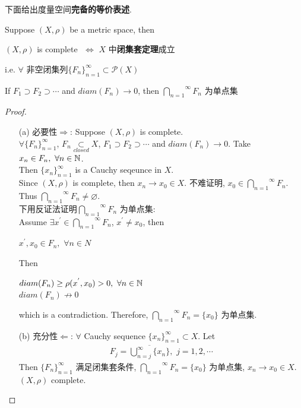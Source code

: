 	下面给出度量空间\textbf{完备的等价表述}.
	\begin{proposition}\label{prop 1.2.1}
		Suppose $(X , \rho)$ be a metric space, then
		\begin{center}
			$(X , \rho)$ is complete $\,\, \Leftrightarrow \,\, X$ 中\textbf{闭集套定理}成立
		\end{center}
		i.e. $\forall$ 非空闭集列$\{ F_n \}_{n = 1}^{\infty} \subset \mathcal{P}(X)$ 
		\begin{center}
			If $F_1 \supset F_2 \supset \cdots$ and $diam(F_n) \to 0$, then $\overset{\infty}{\underset{n = 1}{\bigcap}}{F_n}$ 为单点集
		\end{center}
		
		\vspace{6em}
		
		\begin{proof}
			\begin{enumerate}
				\item[(a)] 必要性$\Rightarrow$: Suppose $(X , \rho)$ is complete. \\
				$\forall \{ F_n \}_{n = 1}^{\infty}$, $F_n \underset{closed}{\subset} X$, $F_1 \supset F_2 \supset \cdots$ and $diam(F_n) \to 0$. Take $x_n \in F_n, \,\, \forall n \in \mathbb{N}$. \\
				Then $\{ x_n \}_{n = 1}^{\infty}$ is a Cauchy seqeunce in $X$. \\
				Since $(X , \rho)$ is complete, then $x_n \to x_0 \in X$. 不难证明, $x_0 \in \overset{\infty}{\underset{n = 1}{\bigcap}}{F_n}$. Thus $\overset{\infty}{\underset{n = 1}{\bigcap}}{F_n} \neq \varnothing$. \\
				下用反证法证明$\overset{\infty}{\underset{n = 1}{\bigcap}}{F_n}$ 为单点集: \\
				Assume $\exists x^{'} \in \overset{\infty}{\underset{n = 1}{\bigcap}}{F_n}$, $x^{'} \neq x_0$, then
				\begin{center}
					$x^{'} , x_0 \in F_n , \,\, \forall n \in N$
				\end{center}
				Then
				\begin{center}
					$diam(F_n) \geq \rho(x^{'} , x_0) > 0 , \,\, \forall n \in \mathbb{N}$ \\
					$diam(F_n) \not\to 0$
				\end{center}
				which is a contradiction. Therefore, $\overset{\infty}{\underset{n = 1}{\bigcap}}{F_n} = \{ x_0 \}$ 为单点集.
				
				\vspace{4em}
				
				\item[(b)] 充分性$\Leftarrow$: $\forall$ Cauchy sequence $\{ x_n \}_{n = 1}^{\infty} \subset X$. Let
				\begin{align}
					F_j = \overline{\bigcup_{n = j}^{\infty}{\{ x_n \}}} , \,\, j = 1 , 2 , \cdots
				\end{align}
				Then $\{ F_n \}_{n = 1}^{\infty}$ 满足闭集套条件, $\overset{\infty}{\underset{n = 1}{\bigcap}}{F_n} = \{ x_0 \}$ 为单点集, $x_n \to x_0 \in X$. $(X , \rho)$ complete.
			\end{enumerate}
		\end{proof}
	\end{proposition}

